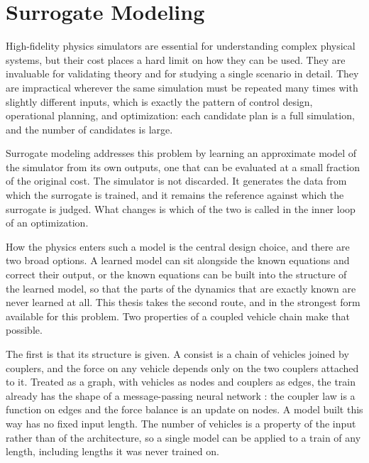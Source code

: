 \section{Surrogate Modeling}

High-fidelity physics simulators are essential for understanding complex physical systems, but their cost places a hard limit on how they can be used. They are invaluable for validating theory and for studying a single scenario in detail. They are impractical wherever the same simulation must be repeated many times with slightly different inputs, which is exactly the pattern of control design, operational planning, and optimization: each candidate plan is a full simulation, and the number of candidates is large.

Surrogate modeling addresses this problem by learning an approximate model of the simulator from its own outputs, one that can be evaluated at a small fraction of the original cost. The simulator is not discarded. It generates the data from which the surrogate is trained, and it remains the reference against which the surrogate is judged. What changes is which of the two is called in the inner loop of an optimization.

How the physics enters such a model is the central design choice, and there are two broad options. A learned model can sit alongside the known equations and correct their output, or the known equations can be built into the structure of the learned model, so that the parts of the dynamics that are exactly known are never learned at all. This thesis takes the second route, and in the strongest form available for this problem. Two properties of a coupled vehicle chain make that possible.

The first is that its structure is given. A consist is a chain of vehicles joined by couplers, and the force on any vehicle depends only on the two couplers attached to it. Treated as a graph, with vehicles as nodes and couplers as edges, the train already has the shape of a message-passing neural network \cite{battaglia2018relational}: the coupler law is a function on edges and the force balance is an update on nodes. A model built this way has no fixed input length. The number of vehicles is a property of the input rather than of the architecture, so a single model can be applied to a train of any length, including lengths it was never trained on.

